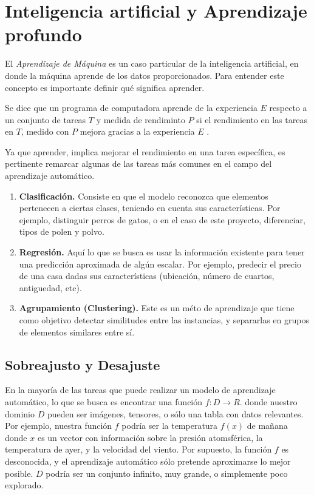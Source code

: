     \section{Inteligencia artificial y Aprendizaje profundo}
    El \textsl{Aprendizaje de Máquina} es un caso particular de la inteligencia artificial, en donde la máquina aprende de los datos proporcionados. Para entender este concepto es importante definir qué significa aprender.
    \begin{definition}
        Se dice que un programa de computadora aprende de la experiencia $E$ respecto a un conjunto de tareas $T$ y medida de rendiminto $P$ si el rendimiento en las tareas en $T$, medido con $P$ mejora gracias a la experiencia $E$ \cite{Mitchell}.
    \end{definition}
    Ya que aprender, implica mejorar el rendimiento en una tarea específica, es pertinente remarcar algunas de las tareas más comunes en el campo del aprendizaje automático.
    \begin{enumerate}
        \item \textbf{Clasificación.} Consiste en que el modelo reconozca que elementos pertenecen a ciertas clases, teniendo en cuenta sus características. Por ejemplo, distinguir perros de gatos, o en el caso de este proyecto, diferenciar, tipos de polen y polvo.
        \item \textbf{Regresión.} Aquí lo que se busca es usar la información existente para tener una predicción aproximada de algún escalar. Por ejemplo, predecir el precio de una casa dadas sus características (ubicación, número de cuartos, antiguedad, etc).
        \item \textbf{Agrupamiento (Clustering).} Este es un méto de aprendizaje que tiene como objetivo detectar similitudes entre las instancias, y separarlas en grupos de elementos similares entre sí.
    \end{enumerate}
    
    \subsection{Sobreajusto y Desajuste}
    En la mayoría de las tareas que puede realizar un modelo de aprendizaje automático, lo que se busca es encontrar una función $f: D \to R$. donde nuestro dominio $D$ pueden ser imágenes, tensores, o sólo una tabla con datos relevantes. Por ejemplo, nuestra función $f$ podría ser la temperatura $f(x)$ de mañana donde $x$ es un vector con información sobre la presión atomsférica, la temperatura de ayer, y la velocidad del viento. Por supuesto, la función $f$ es desconocida, y el aprendizaje automático sólo pretende aproximarse lo mejor posible. $D$ podría ser un conjunto infinito, muy grande, o simplemente poco explorado.

